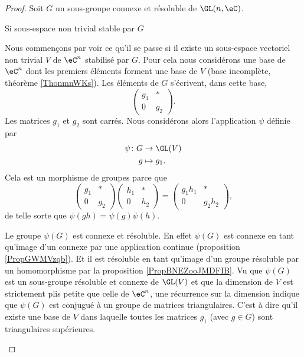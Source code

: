 \begin{proof}
    Soit \( G\) un sous-groupe connexe et résoluble de \( \GL(n,\eC)\).
    
    \begin{subproof}
        \item[Si sous-espace non trivial stable par \( G\)]

    Nous commençons par voir ce qu'il se passe si il existe un sous-espace vectoriel non trivial \( V\) de \( \eC^n\) stabilisé par \( G\). Pour cela nous considérons une base de \( \eC^n\) dont les premiers éléments forment une base de \( V\) (base incomplète, théorème \ref{ThonmnWKs}). Les éléments de \( G\) s'écrivent, dans cette base,
    \begin{equation}    \label{EqGOKTooEaGACG}
        \begin{pmatrix}
            g_1    &   *    \\ 
            0    &   g_2    
        \end{pmatrix}.
    \end{equation}
    Les matrices \( g_1\) et \( g_2\) sont carrés. Nous considérons alors l'application \( \psi\) définie par
    \begin{equation}
        \begin{aligned}
            \psi\colon G&\to \GL(V) \\
            g&\mapsto g_1.
        \end{aligned}
    \end{equation}
    Cela est un morphisme de groupes parce que
    \begin{equation}
        \begin{pmatrix}
            g_1    &   *    \\ 
            0    &   g_2    
        \end{pmatrix}\begin{pmatrix}
            h_1    &   *    \\ 
            0    &   h_2    
        \end{pmatrix}=
        \begin{pmatrix}
            g_1h_1    &   *    \\ 
            0    &   g_2h_2    
        \end{pmatrix},
    \end{equation}
    de telle sorte que \( \psi(gh)=\psi(g)\psi(h)\).

    Le groupe \( \psi(G)\) est connexe et résoluble. En effet \( \psi(G)\) est connexe en tant qu'image d'un connexe par une application continue (proposition \ref{PropGWMVzqb}). Et il est résoluble en tant qu'image d'un groupe résoluble par un homomorphisme par la proposition \ref{PropBNEZooJMDFIB}. Vu que \( \psi(G)\) est un sous-groupe résoluble et connexe de \( \GL(V)\) et que la dimension de \( V\) est strictement plis petite que celle de \( \eC^n\), une récurrence sur la dimension indique que \( \psi(G)\) est conjugué à un groupe de matrices triangulaires. C'est à dire qu'il existe une base de \( V\) dans laquelle toutes les matrices \( g_1\) (avec \( g\in G\)) sont triangulaires supérieures.


\end{subproof}
\end{proof}
